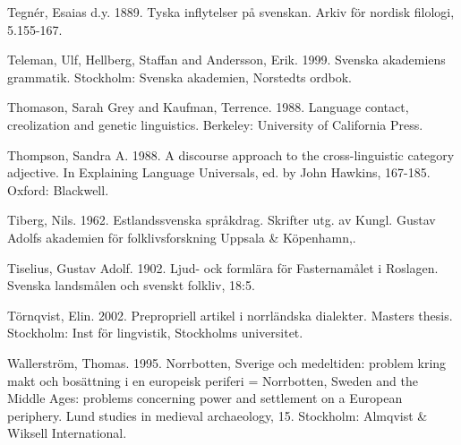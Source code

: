 Tegnér, Esaias d.y. 1889. Tyska inflytelser på svenskan. Arkiv för nordisk filologi, 5.155-167.


Teleman, Ulf, Hellberg, Staffan and Andersson, Erik. 1999. Svenska akademiens grammatik. Stockholm: Svenska akademien, Norstedts ordbok.


Thomason, Sarah Grey and Kaufman, Terrence. 1988. Language contact, creolization and genetic linguistics. Berkeley: University of California Press.


Thompson, Sandra A. 1988. A discourse approach to the cross-linguistic category {\textquotedbl}adjective{\textquotedbl}. In Explaining Language Universals, ed. by John Hawkins, 167-185. Oxford: Blackwell.


Tiberg, Nils. 1962. Estlandssvenska språkdrag. Skrifter utg. av Kungl. Gustav Adolfs akademien för folklivsforskning Uppsala \& Köpenhamn,.


Tiselius, Gustav Adolf. 1902. Ljud- ock formlära för Fasternamålet i Roslagen. Svenska landsmålen och svenskt folkliv, 18:5.


Törnqvist, Elin. 2002. Prepropriell artikel i norrländska dialekter. Masters thesis. Stockholm: Inst för lingvistik, Stockholms universitet.


Wallerström, Thomas. 1995. Norrbotten, Sverige och medeltiden: problem kring makt och bosättning i en europeisk periferi = Norrbotten, Sweden and the Middle Ages: problems concerning power and settlement on a European periphery. Lund studies in medieval archaeology, 15. Stockholm: Almqvist \& Wiksell International.


